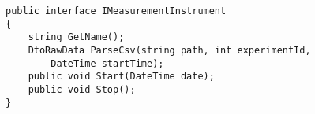 \begin{lstlisting}[caption=The interface used to implement the measurement instruments, label={lst:measurement_instruments}]
public interface IMeasurementInstrument
{
    string GetName();
    DtoRawData ParseCsv(string path, int experimentId, 
        DateTime startTime);
    public void Start(DateTime date);
    public void Stop();
}
\end{lstlisting}